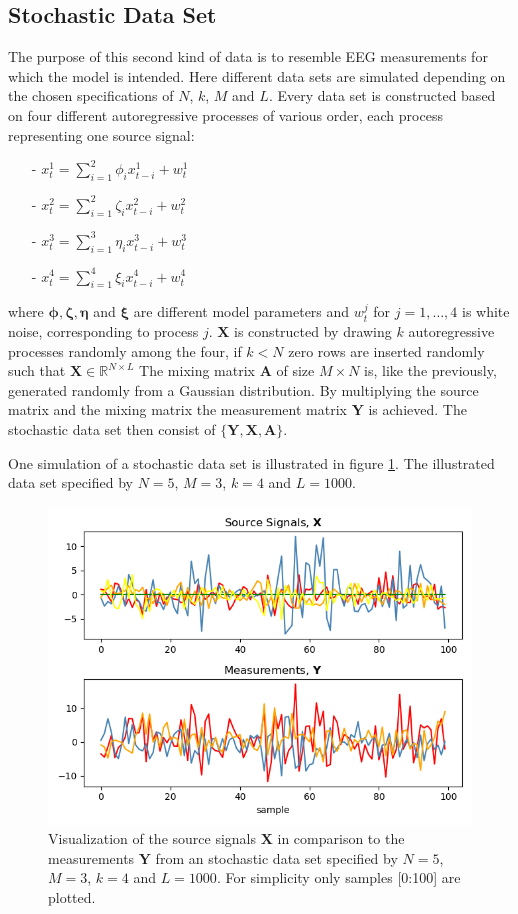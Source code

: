 \subsection{Stochastic Data Set}
The purpose of this second kind of data is to resemble EEG measurements for which the model is intended. Here different data sets are simulated depending on the chosen specifications of $N$, $k$, $M$ and $L$. 
Every data set is constructed based on four different autoregressive processes of various order, each process representing one source signal:
\begin{itemize}
\item[-] $x_{t}^{1} = \sum_{i=1}^{2} \phi_i x_{t-i}^{1} + w_t^{1}$
\item[-] $x_{t}^{2} = \sum_{i=1}^{2} \zeta_i x_{t-i}^{2} + w_t^{2}$
\item[-] $x_{t}^{3} = \sum_{i=1}^{3} \eta_i x_{t-i}^{3} + w_t^{3}$
\item[-] $x_{t}^{4} = \sum_{i=1}^{4} \xi_i x_{t-i}^{4} + w_t^{4}$
\end{itemize}
where $\boldsymbol{\phi}, \boldsymbol{\zeta}, \boldsymbol{\eta}$ and $\boldsymbol{\xi}$ are different model parameters and $w_t^{j}$ for $j = 1,\hdots ,4$ is white noise, corresponding to process $j$.
$\mathbf{X}$ is constructed by drawing $k$ autoregressive processes randomly among the four, if $k < N$ zero rows are inserted randomly such that $\mathbf{X} \in \mathbb{R}^{N \times L}$  
The mixing matrix $\mathbf{A}$ of size $M \times N$ is, like the previously, generated randomly from a Gaussian distribution.
By multiplying the source matrix and the mixing matrix the measurement matrix $\mathbf{Y}$ is achieved.
The stochastic data set then consist of $\{ \mathbf{Y}, \mathbf{X}, \mathbf{A} \}$. 

One simulation of a stochastic data set is illustrated in figure \ref{fig:AR}. The illustrated data set specified by $N = 5$, $M = 3$, $k = 4$ and $L = 1000$.
\begin{figure}[H]
\centering
\includegraphics[scale=0.5]{figures/ch_6/AR_data.png}
\caption{Visualization of the source signals $\mathbf{X}$ in comparison to the measurements $\mathbf{Y}$ from an stochastic data set specified by $N = 5$, $M = 3$, $k = 4$ and $L=1000$. For simplicity only samples [0:100] are plotted.}
\label{fig:AR}
\end{figure}
\noindent

